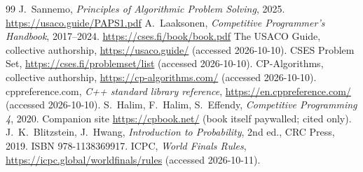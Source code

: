 \begin{thebibliography}{99}
 J.~Sannemo, \emph{Principles of Algorithmic Problem Solving}, 2025. \url{https://usaco.guide/PAPS1.pdf}
 A.~Laaksonen, \emph{Competitive Programmer's Handbook}, 2017--2024. \url{https://cses.fi/book/book.pdf}
 The USACO Guide, collective authorship, \url{https://usaco.guide/} (accessed 2026-10-10).
 CSES Problem Set, \url{https://cses.fi/problemset/list} (accessed 2026-10-10).
 CP-Algorithms, collective authorship, \url{https://cp-algorithms.com/} (accessed 2026-10-10).
 cppreference.com, \emph{C++ standard library reference}, \url{https://en.cppreference.com/} (accessed 2026-10-10).
 S.~Halim, F.~Halim, S.~Effendy, \emph{Competitive Programming 4}, 2020. Companion site \url{https://cpbook.net/} (book itself paywalled; cited only).
 J.~K.~Blitzstein, J.~Hwang, \emph{Introduction to Probability}, 2nd ed., CRC Press, 2019. ISBN 978-1138369917.
 ICPC, \emph{World Finals Rules}, \url{https://icpc.global/worldfinals/rules} (accessed 2026-10-11).
\end{thebibliography}
